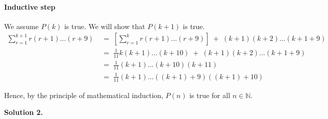 \documentclass[10pt]{article}
\begin{document}
\begin{enumerate}
                \paragraph{Inductive step}
                We assume $P(k)$ is true. We will show that $P(k + 1)$ is true.
                \begin{align*}
                \sum_{r = 1}^{k + 1} r(r + 1)\dots(r + 9)
                                \;&=\; \left[\sum_{r = 1}^{k} r(r + 1)\dots(r + 9)\right] \;+\; (k + 1)(k + 2)\dots(k + 1 + 9) \\
                                \;&=\; \frac{1}{11}k(k + 1)\dots(k + 10) \;+\; (k + 1)(k + 2)\dots(k + 1 + 9) \tag{From $P(k)$}\\
                                \;&=\; \frac{1}{11}(k + 1)\dots(k + 10)(k + 11)\\
                                \;&=\; \frac{1}{11}(k + 1)\dots((k + 1) + 9)((k + 1) + 10)
                \end{align*}

                Hence, by the principle of mathematical induction, $P(n)$ is true for all $n \in \mathbb{N}$.
        \end{enumerate}
        \textbf{Solution 2.}
\end{document}
